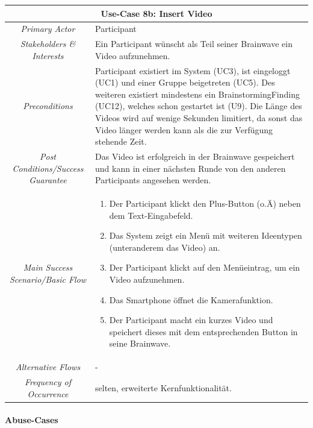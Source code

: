 \renewcommand{\arraystretch}{1.35}
\begin{center}
	\begin{longtable}{| c | p{7cm} |}
		\hline
		\multicolumn{2}{|c|}{\textbf{Use-Case 8b: Insert Video}}\\
		\hline\hline
		\textit{Primary Actor} & Participant\\
		\hline
		\textit{Stakeholders \& Interests} & Ein Participant wünscht als Teil seiner Brainwave ein Video aufzunehmen. \\
		\hline
		\textit{Preconditions} & Participant existiert im System (UC3), ist eingeloggt (UC1) und einer Gruppe beigetreten (UC5). Des weiteren existiert mindestens ein BrainstormingFinding (UC12), welches schon gestartet ist (U9). Die Länge des Videos wird auf wenige Sekunden limitiert, da sonst das Video länger werden kann als die zur Verfügung stehende Zeit.\\
		\hline
		\textit{Post Conditions/Success Guarantee} & Das Video ist erfolgreich in der Brainwave gespeichert und kann in einer nächsten Runde von den anderen Participants angesehen werden.\\
		\hline
		\textit{Main Success Scenario/Basic Flow} & 
		\begin{enumerate}[noitemsep]
			\item Der Participant klickt den Plus-Button (o.Ä) neben dem Text-Eingabefeld.
			\item Das System zeigt ein Menü mit weiteren Ideentypen (unteranderem das Video) an.
			\item Der Participant klickt auf den Menüeintrag, um ein Video aufzunehmen.
			\item Das Smartphone öffnet die Kamerafunktion.
			\item Der Participant macht ein kurzes Video und speichert dieses mit dem entsprechenden Button in seine Brainwave.
		\end{enumerate}\\
		\hline
		\textit{Alternative Flows} &
		-\\
		\hline
		\textit{Frequency of Occurrence} & selten, erweiterte Kernfunktionalität.\\
		\hline
	\end{longtable}
\end{center}



\paragraph{Abuse-Cases}

